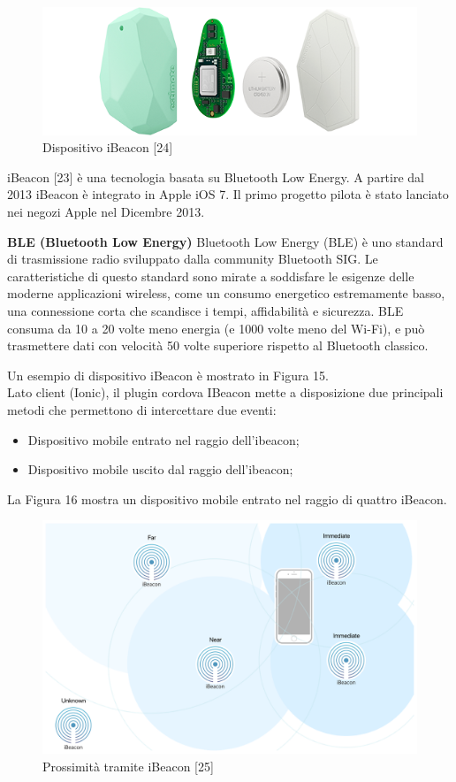 \begin{figure}[H]
    \centering  
    \caption{Dispositivo iBeacon [24]}
    \includegraphics[scale=0.3]{img/cap2/beacon}
\end{figure}

iBeacon [23] è una tecnologia basata su Bluetooth Low Energy. A partire dal 2013 iBeacon è 
integrato in Apple iOS 7. Il primo progetto pilota è stato lanciato nei negozi Apple nel
Dicembre 2013.

\textbf{BLE (Bluetooth Low Energy)}
Bluetooth Low Energy (BLE) è uno standard di trasmissione radio sviluppato dalla community 
Bluetooth SIG. Le caratteristiche di questo standard sono mirate a soddisfare le esigenze
delle moderne applicazioni wireless, come un consumo energetico estremamente basso, una
connessione corta che scandisce i tempi, affidabilità e sicurezza. 
BLE consuma da 10 a 20 volte meno energia (e 1000 volte meno del Wi-Fi), e può trasmettere
dati con velocità 50 volte superiore rispetto al Bluetooth classico. 

Un esempio di dispositivo iBeacon è mostrato in Figura 15.\\
Lato client (Ionic), il plugin cordova IBeacon mette a disposizione due principali metodi
che permettono di intercettare due eventi:

\begin{itemize}
    \item Dispositivo mobile entrato nel raggio dell'ibeacon;
    \item Dispositivo mobile uscito dal raggio dell'ibeacon;
\end{itemize}

La Figura 16 mostra un dispositivo mobile entrato nel raggio di quattro iBeacon.
\begin{figure}[H]
    \centering  
    \caption{Prossimità tramite iBeacon [25]}
    \includegraphics[scale=0.3]{img/cap2/beacon-proximity}
\end{figure}


